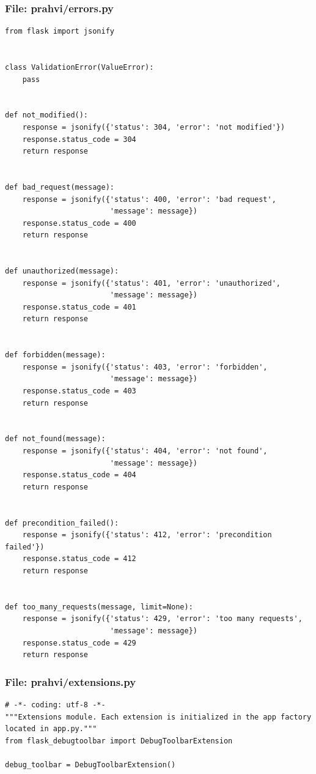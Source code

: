 \subsubsection{File: prahvi/errors.py}
\begin{lstlisting}
from flask import jsonify


class ValidationError(ValueError):
    pass


def not_modified():
    response = jsonify({'status': 304, 'error': 'not modified'})
    response.status_code = 304
    return response


def bad_request(message):
    response = jsonify({'status': 400, 'error': 'bad request',
                        'message': message})
    response.status_code = 400
    return response


def unauthorized(message):
    response = jsonify({'status': 401, 'error': 'unauthorized',
                        'message': message})
    response.status_code = 401
    return response


def forbidden(message):
    response = jsonify({'status': 403, 'error': 'forbidden',
                        'message': message})
    response.status_code = 403
    return response


def not_found(message):
    response = jsonify({'status': 404, 'error': 'not found',
                        'message': message})
    response.status_code = 404
    return response


def precondition_failed():
    response = jsonify({'status': 412, 'error': 'precondition failed'})
    response.status_code = 412
    return response


def too_many_requests(message, limit=None):
    response = jsonify({'status': 429, 'error': 'too many requests',
                        'message': message})
    response.status_code = 429
    return response
\end{lstlisting}

\subsubsection{File: prahvi/extensions.py}
\begin{lstlisting}
# -*- coding: utf-8 -*-
"""Extensions module. Each extension is initialized in the app factory located in app.py."""
from flask_debugtoolbar import DebugToolbarExtension

debug_toolbar = DebugToolbarExtension()
\end{lstlisting}

